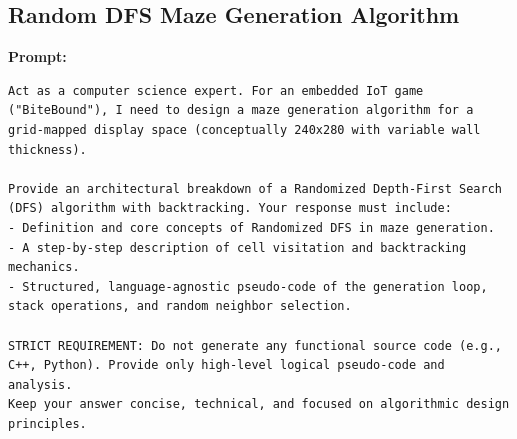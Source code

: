 \subsection{Random DFS Maze Generation Algorithm}

\textbf{Prompt:}
\begin{lstlisting}[language={}, breaklines=true]
Act as a computer science expert. For an embedded IoT game ("BiteBound"), I need to design a maze generation algorithm for a grid-mapped display space (conceptually 240x280 with variable wall thickness).

Provide an architectural breakdown of a Randomized Depth-First Search (DFS) algorithm with backtracking. Your response must include:
- Definition and core concepts of Randomized DFS in maze generation.
- A step-by-step description of cell visitation and backtracking mechanics.
- Structured, language-agnostic pseudo-code of the generation loop, stack operations, and random neighbor selection.

STRICT REQUIREMENT: Do not generate any functional source code (e.g., C++, Python). Provide only high-level logical pseudo-code and analysis.
Keep your answer concise, technical, and focused on algorithmic design principles.
\end{lstlisting}

